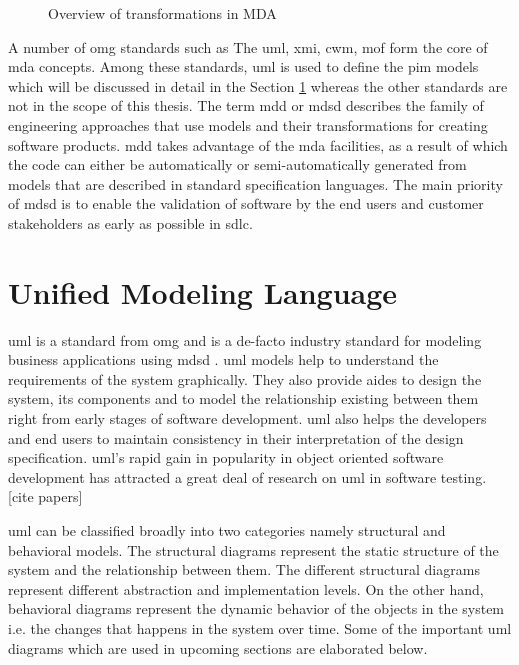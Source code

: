 \begin{figure}[htb!]
\centering
{}
\caption{Overview of transformations in MDA \cite{cerny2015separation}}
\label{fig:Overview_MDA}
\end{figure}

A number of \gls{omg} standards such as The \gls{uml}, \gls{xmi}, \gls{cwm}, \gls{mof} form the core of \gls{mda} concepts. Among these standards, \gls{uml} is used to define the \gls{pim} models which will be discussed in detail in the Section \ref{secuml} whereas the other standards are not in the scope of this thesis.
The term \gls{mdd} or \gls{mdsd} describes the family of engineering approaches that use models and their transformations for creating software products. \gls{mdd} takes advantage of the \gls{mda} facilities, as a result of which the code can either be automatically or semi-automatically generated from models that are described in standard specification languages. The main priority of \gls{mdsd} is to enable the validation of software by the end users and customer stakeholders as early as possible in \gls{sdlc}.


\section{Unified Modeling Language} \label{secuml}
\gls{uml} is a standard from \gls{omg} and is a de-facto industry standard for modeling business applications using \gls{mdsd} \cite{cerny2015separation}. \gls{uml} models help to understand the requirements of the system graphically. They also provide aides to design the system, its components and to model the relationship existing between them right from early stages of software development. \gls{uml} also helps the developers and end users to maintain consistency in their interpretation of the design specification. \gls{uml}’s rapid gain in popularity in object oriented software development has attracted a great deal of research on \gls{uml} in software testing. [cite papers]

\gls{uml} can be classified broadly into two categories namely structural and behavioral models. The structural diagrams represent the static structure of the system and the relationship between them. The different structural diagrams represent different abstraction and implementation levels. On the other hand, behavioral diagrams represent the dynamic behavior of the objects in the system i.e. the changes that happens in the system over time. Some of the important \gls{uml} diagrams which are used in upcoming sections are elaborated below.

